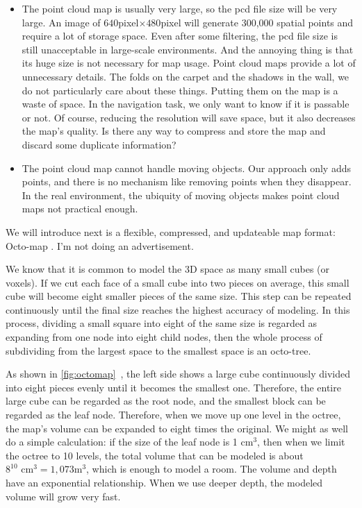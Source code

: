 \begin{itemize}
	\item The point cloud map is usually very large, so the pcd file size will be very large. An image of $640$pixel$\times480$pixel will generate 300,000 spatial points and require a lot of storage space. Even after some filtering, the pcd file size is still unacceptable in large-scale environments. And the annoying thing is that its huge size is not necessary for map usage. Point cloud maps provide a lot of unnecessary details. The folds on the carpet and the shadows in the wall, we do not particularly care about these things. Putting them on the map is a waste of space.  In the navigation task, we only want to know if it is passable or not. Of course, reducing the resolution will save space, but it also decreases the map's quality. Is there any way to compress and store the map and discard some duplicate information?
	\item The point cloud map cannot handle moving objects. Our approach only adds points, and there is no mechanism like removing points when they disappear. In the real environment, the ubiquity of moving objects makes point cloud maps not practical enough.
\end{itemize}

We will introduce next is a flexible, compressed, and updateable map format: Octo-map {\cite{Hornung2013}}. I'm not doing an advertisement.

We know that it is common to model the 3D space as many small cubes (or voxels). If we cut each face of a small cube into two pieces on average, this small cube will become eight smaller pieces of the same size. This step can be repeated continuously until the final size reaches the highest accuracy of modeling. In this process, dividing a small square into eight of the same size is regarded as expanding from one node into eight child nodes, then the whole process of subdividing from the largest space to the smallest space is an octo-tree.

As shown in \autoref{fig:octomap}~, the left side shows a large cube continuously divided into eight pieces evenly until it becomes the smallest one. Therefore, the entire large cube can be regarded as the root node, and the smallest block can be regarded as the leaf node. Therefore, when we move up one level in the octree, the map's volume can be expanded to eight times the original. We might as well do a simple calculation: if the size of the leaf node is 1 cm$^3$, then when we limit the octree to 10 levels, the total volume that can be modeled is about $8^{10}\text{ cm}^3 = 1,073\text{m}^3$, which is enough to model a room. The volume and depth have an exponential relationship. When we use deeper depth, the modeled volume will grow very fast.

